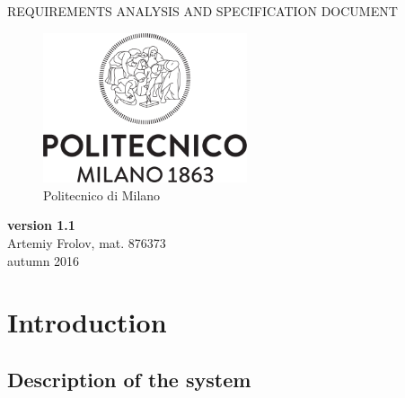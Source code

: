 \documentclass[12pt, letterpaper]{article}
\begin{document}
\begin{titlepage}
\centering
{\Large REQUIREMENTS ANALYSIS AND SPECIFICATION DOCUMENT} \\
\begin{figure}[h]
\centering
\includegraphics[width=6cm]{Logo_Politecnico_Milano.png}
\caption{Politecnico di Milano}
\label{fig:PoliMi}
\end{figure}
\textbf{version 1.1} \\
\vspace{0.5cm}
Artemiy Frolov, mat. 876373 \\
\vspace{0.5cm}
autumn 2016
\end{titlepage}


\tableofcontents{}

\newpage

\section{Introduction}
\subsection{Description of the system}
\end{document}
